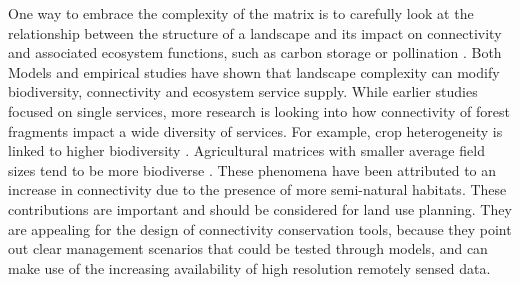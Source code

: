 \documentclass[12pt,Bold,TexShade]{thesis/mcgilletdclass}
\begin{document}
{One way to embrace the complexity of the matrix is to carefully look at the relationship between the structure of a landscape and its impact on connectivity and associated ecosystem functions, such as carbon storage or pollination \citep{mitchell_linking_2013}. Both Models \citep{mitchell_strong_2015} and empirical studies \citep{mitchell_forest_2014} have shown that landscape complexity can modify biodiversity, connectivity and ecosystem service supply. While earlier studies focused on single services, more research is looking into how connectivity of forest fragments impact a wide diversity of services\citep{mitchell_forest_2014}. For example, crop heterogeneity is linked to higher biodiversity \citep{sirami_increasing_2019}. Agricultural matrices with smaller average field sizes tend to be more biodiverse \citep{fahrig_farmlands_2015}. These phenomena have been attributed to an increase in connectivity due to the presence of more semi-natural habitats. These contributions are important and should be considered for land use planning. They are appealing for the design of connectivity conservation tools, because they point out clear management scenarios that could be tested through models, and can make use of the increasing availability of high resolution remotely sensed data. \\

}
\end{document}
